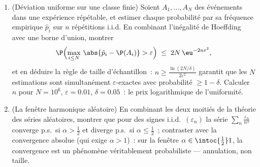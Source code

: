 \begin{problem}
\begin{enumerate}[resume]
  \item (Déviation uniforme sur une classe finie) Soient
        $A_1, \dots, A_N$ des événements dans une
        expérience répétable, et estimer chaque
        probabilité par sa fréquence empirique $\hat p_i$
        sur $n$ répétitions i.i.d. En combinant l'inégalité
        de Hoeffding avec une borne d'union, montrer
        \[
        \P\Bigl(\max_{i\leq N}\,\abs{\hat p_i - \P(A_i)} >
        \varepsilon\Bigr) \;\leq\; 2N\,\eu^{-2n\varepsilon^2},
        \]
        et en déduire la règle de taille d'échantillon~: $n
        \geq \frac{\ln(2N/\delta)}{2\varepsilon^2}$ garantit
        que les $N$ estimations sont simultanément
        $\varepsilon$-exactes avec probabilité $\geq 1 -
        \delta$. Calculer $n$ pour $N = 10^6$, $\varepsilon
        = 0.01$, $\delta = 0.05$~: le prix logarithmique de
        l'uniformité.
  \item (La fenêtre harmonique aléatoire) En combinant les
        deux moitiés de la théorie des séries aléatoires,
        montrer que pour des signes i.i.d.\
        $(\varepsilon_n)$ la série
        $\sum_n\frac{\varepsilon_n}{n^\alpha}$ converge
        p.s.\ si $\alpha > \frac12$ et diverge p.s.\ si
        $\alpha \leq \frac12$~; contraster avec la
        convergence absolue (qui exige $\alpha > 1$)~: sur
        la fenêtre $\alpha \in \intoc{\frac12}1$, la
        convergence est un phénomène véritablement
        probabiliste --- annulation, non taille.
\end{enumerate}
\end{problem}
